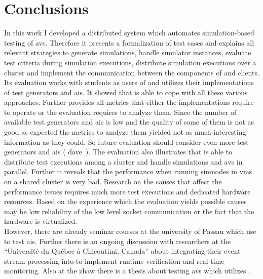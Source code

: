 \section{Conclusions}
In this work I developed a distributed system which automates simulation-based testing of \glspl{av}.
Therefore it presents a formalization of test cases and explains all relevant strategies to generate simulations, handle simulator instances, evaluate test criteria during simulation executions, distribute simulation executions over a cluster and implement the communication between the components of \drivebuild{} and clients.
Its evaluation works with students as users of \drivebuild{} and utilizes their implementations of test generators and \glspl{ai}.
It showed that \drivebuild{} is able to cope with all these various approaches.
Further \drivebuild{} provides all metrics that either the implementations require to operate or the evaluation requires to analyze them.
Since the number of available test generators and \glspl{ai} is low and the quality of some of them is not as good as expected the metrics to analyze them yielded not as much interesting information as they could.
So future evaluation should consider even more test generators and \glspl{ai} (\eg{} \gls{dave}~\cite{dave}).
The evaluation also illustrates that \drivebuild{} is able to distribute test executions among a cluster and handle simulations and \glspl{av} in parallel.
Further it reveals that the performance when running \glspl{simnode} in \glspl{vm} on a shared cluster is very bad.
Research on the causes that affect the performance issues requires much more test executions and dedicated hardware resources.
Based on the experience which the evaluation yields possible causes may be low reliability of the low level socket communication or the fact that the hardware is virtualized.\\
However, there are already seminar courses at the university of Passau which use \drivebuild{} to test \glspl{ai}.
Further there is an ongoing discussion with researchers at the \enquote{Université du Québec à Chicoutimi, Canada} about integrating their event stream processing into \drivebuild{} to implement runtime verification and real-time monitoring.
Also at the \gls{zhaw} there is a thesis about testing \glspl{av} which utilizes \drivebuild{}.
